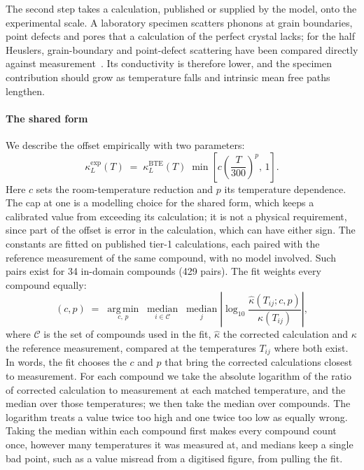 The second step takes a calculation, published or supplied by the model, onto the experimental
scale. A laboratory specimen scatters phonons at grain boundaries, point defects and pores that a
calculation of the perfect crystal lacks; for the  half Heuslers, grain-boundary and
point-defect scattering have been compared directly against measurement~\cite{schrade2017the}. Its
conductivity is therefore lower, and the
specimen contribution should grow as temperature falls and intrinsic mean free paths lengthen.

\paragraph{The shared form} We describe the offset empirically with two parameters:
%
\begin{equation}
  \kappa_L^{\mathrm{exp}}(T) \;=\; \kappa_L^{\mathrm{BTE}}(T)\;
    \min\!\left[c\left(\frac{T}{300}\right)^{p},\,1\right].
  \label{eq:transfer}
\end{equation}
%
Here $c$ sets the room-temperature reduction and $p$ its temperature dependence. The cap at one is a
modelling choice for the shared form, which keeps a calibrated value from exceeding its calculation;
it is not a physical requirement, since part of the offset is error in the calculation, which can
have either sign. The constants are fitted on published tier-1 calculations, each paired with the
reference measurement of the same compound, with no model involved. Such pairs exist for
\num{34} in-domain compounds (\num{429} pairs). The fit weights every compound equally:
%
\begin{equation}
  (c, p) \;=\; \operatorname*{arg\,min}_{c,\,p}\;
    \operatorname*{median}_{i \in \mathcal{C}}\;
    \operatorname*{median}_{j}
    \left|\log_{10}\frac{\hat{\kappa}(T_{ij};c,p)}{\kappa(T_{ij})}\right|,
  \label{eq:fit}
\end{equation}
%
where $\mathcal{C}$ is the set of compounds used in the fit, $\hat{\kappa}$ the corrected
calculation and $\kappa$ the reference measurement, compared at the temperatures $T_{ij}$ where both
exist. In words, the fit chooses the $c$ and $p$ that bring the corrected calculations closest to
measurement. For each compound we take the absolute logarithm of the ratio of corrected calculation
to measurement at each matched temperature, and the median over those temperatures; we then take the
median over compounds. The logarithm treats a value twice too high and one twice too low as equally
wrong. Taking the median within each compound first makes every compound count once, however many
temperatures it was measured at, and medians keep a single bad point, such as a value misread from a
digitised figure, from pulling the fit.

